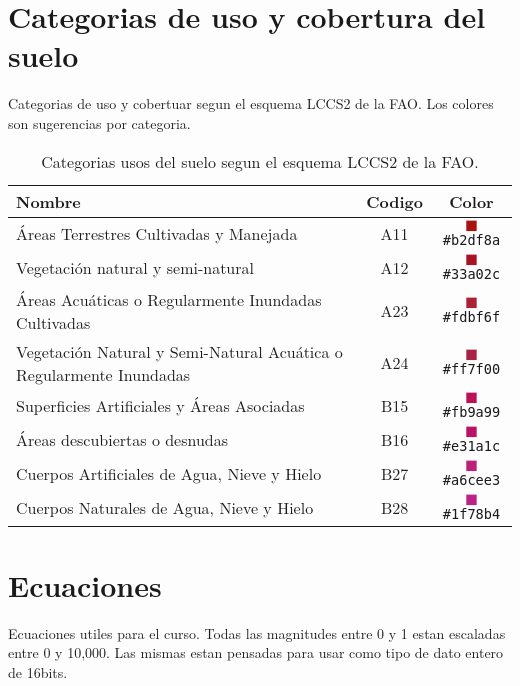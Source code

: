 \documentclass[hidelinks,12pt]{article}
\begin{document}
\section{Categorias de uso y cobertura del suelo}\label{apcate}
Categorias de uso y cobertuar segun el esquema LCCS2 de la FAO\@. Los colores son
sugerencias por categoria.
\begin{table}[hbt]
    \centering
    \begin{tabular}{p{11cm}cc}
        \toprule
        Nombre & Codigo & Color \\
        \midrule 
        Áreas Terrestres Cultivadas y Manejada & A11 & \textcolor{A11}{$\blacksquare$}\texttt{\#b2df8a}
        \\
        Vegetación natural y semi-natural & A12 & \textcolor{A12}{$\blacksquare$}\texttt{\#33a02c}\\
        Áreas Acuáticas o Regularmente Inundadas Cultivadas & A23  &
        \textcolor{A23}{$\blacksquare$}\texttt{\#fdbf6f}\\
        Vegetación Natural y Semi-Natural Acuática o
	Regularmente Inundadas & A24 & \textcolor{A24}{$\blacksquare$}\texttt{\#ff7f00}\\
        Superficies Artificiales y Áreas Asociadas & B15  &
        \textcolor{B15}{$\blacksquare$}\texttt{\#fb9a99}\\
        Áreas descubiertas o desnudas & B16 & \textcolor{B16}{$\blacksquare$}\texttt{\#e31a1c}\\
        Cuerpos Artificiales de Agua, Nieve y Hielo & B27 &
        \textcolor{B27}{$\blacksquare$}\texttt{\#a6cee3}\\
        Cuerpos Naturales de Agua, Nieve y Hielo & B28&
        \textcolor{B28}{$\blacksquare$}\texttt{\#1f78b4}\\
        \bottomrule
    \end{tabular}
\caption{\label{tabla1}Categorias usos del suelo segun el esquema LCCS2 de la
FAO.}
\end{table}

\section{Ecuaciones}
Ecuaciones utiles para el curso. Todas las magnitudes entre 0 y 1 estan
escaladas entre 0 y 10,000. Las mismas estan pensadas para usar como tipo de
dato entero de 16bits.
\end{document}
